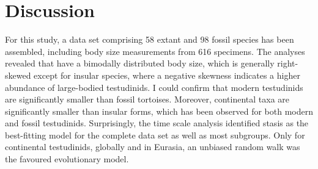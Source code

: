 \section{Discussion}

For this study, a data set comprising 58 extant and 98 fossil species has been assembled, including body size measurements from 616 specimens.
The analyses revealed that \T have a bimodally distributed body size, which is generally right-skewed except for insular species, where a negative skewness indicates a higher abundance of large-bodied testudinids.
I could confirm that modern testudinids are significantly smaller than fossil tortoises. Moreover, continental taxa are significantly smaller than insular forms, which has been observed for both modern and fossil testudinids.
Surprisingly, the time scale analysis identified stasis as the best-fitting model for the complete data set as well as most subgroups. Only for continental testudinids, globally and in Eurasia, an unbiased random walk was the favoured evolutionary model.





